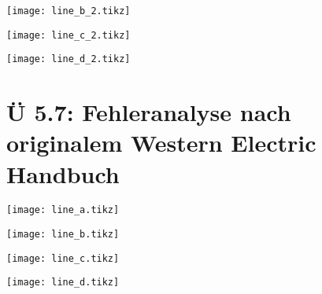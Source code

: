 \documentclass[12pt]{article}
\begin{document}
\texttt{[image: line\_b\_2.tikz]}

\texttt{[image: line\_c\_2.tikz]}

\texttt{[image: line\_d\_2.tikz]}

\section{Ü 5.7: Fehleranalyse nach originalem Western Electric Handbuch}

\texttt{[image: line\_a.tikz]}

\texttt{[image: line\_b.tikz]}

\texttt{[image: line\_c.tikz]}

\texttt{[image: line\_d.tikz]}


\end{document}
